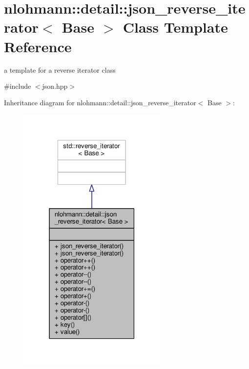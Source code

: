 \hypertarget{classnlohmann_1_1detail_1_1json__reverse__iterator}{}\section{nlohmann\+:\+:detail\+:\+:json\+\_\+reverse\+\_\+iterator$<$ Base $>$ Class Template Reference}
\label{classnlohmann_1_1detail_1_1json__reverse__iterator}


a template for a reverse iterator class  




{\ttfamily \#include $<$json.\+hpp$>$}



Inheritance diagram for nlohmann\+:\+:detail\+:\+:json\+\_\+reverse\+\_\+iterator$<$ Base $>$\+:
\nopagebreak
\begin{figure}[H]
\begin{center}
\leavevmode
\includegraphics[width=210pt]{classnlohmann_1_1detail_1_1json__reverse__iterator__inherit__graph}
\end{center}
\end{figure}


